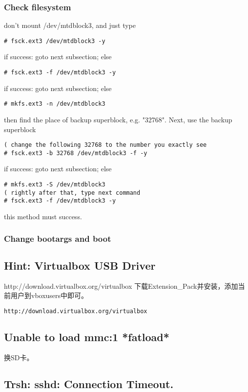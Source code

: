 \documentclass[11pt,a4paper]{article}
\begin{document}
\begin{CJK}{UTF8}{gbsn}
\subsubsection{Check filesystem}
don't mount /dev/mtdblock3, and just type
\begin{verbatim}
# fsck.ext3 /dev/mtdblock3 -y
\end{verbatim}
if success: goto next subsection; else
\begin{verbatim}
# fsck.ext3 -f /dev/mtdblock3 -y
\end{verbatim}
if success: goto next subsection; else
\begin{verbatim}
# mkfs.ext3 -n /dev/mtdblock3
\end{verbatim}
then find the place of backup superblock, e.g. "32768". Next, use the backup superblock
\begin{verbatim}
( change the following 32768 to the number you exactly see
# fsck.ext3 -b 32768 /dev/mtdblock3 -f -y
\end{verbatim}
if success: goto next subsection; else
\begin{verbatim}
# mkfs.ext3 -S /dev/mtdblock3
( rightly after that, type next command
# fsck.ext3 -f /dev/mtdblock3 -y
\end{verbatim}
this method must success.\newline
\subsubsection{Change bootargs and boot}

\subsection{Hint: Virtualbox USB Driver}
http://download.virtualbox.org/virtualbox\newline
下载Extension\_Pack并安装，添加当前用户到vboxusers中即可。
\begin{verbatim}
http://download.virtualbox.org/virtualbox
\end{verbatim}

\subsection{Unable to load mmc:1 *fatload*}
换SD卡。

\subsection{Trsh: sshd: Connection Timeout.}

\end{CJK}
\end{document}

